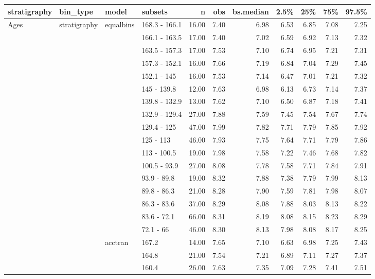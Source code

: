\begin{longtable}{llllrrrrrrr}
  \hline
stratigraphy & bin\_type & model & subsets & n & obs & bs.median & 2.5\% & 25\% & 75\% & 97.5\% \\ 
  \hline
Ages & stratigraphy & equalbins & 168.3 - 166.1 & 16.00 & 7.40 & 6.98 & 6.53 & 6.85 & 7.08 & 7.25 \\ 
   &  &  & 166.1 - 163.5 & 17.00 & 7.40 & 7.02 & 6.59 & 6.92 & 7.13 & 7.32 \\ 
   &  &  & 163.5 - 157.3 & 17.00 & 7.53 & 7.10 & 6.74 & 6.95 & 7.21 & 7.31 \\ 
   &  &  & 157.3 - 152.1 & 16.00 & 7.66 & 7.19 & 6.84 & 7.04 & 7.29 & 7.45 \\ 
   &  &  & 152.1 - 145 & 16.00 & 7.53 & 7.14 & 6.47 & 7.01 & 7.21 & 7.32 \\ 
   &  &  & 145 - 139.8 & 12.00 & 7.63 & 6.98 & 6.13 & 6.73 & 7.14 & 7.37 \\ 
   &  &  & 139.8 - 132.9 & 13.00 & 7.62 & 7.10 & 6.50 & 6.87 & 7.18 & 7.41 \\ 
   &  &  & 132.9 - 129.4 & 27.00 & 7.88 & 7.59 & 7.45 & 7.54 & 7.67 & 7.74 \\ 
   &  &  & 129.4 - 125 & 47.00 & 7.99 & 7.82 & 7.71 & 7.79 & 7.85 & 7.92 \\ 
   &  &  & 125 - 113 & 46.00 & 7.93 & 7.75 & 7.64 & 7.71 & 7.79 & 7.86 \\ 
   &  &  & 113 - 100.5 & 19.00 & 7.98 & 7.58 & 7.22 & 7.46 & 7.68 & 7.82 \\ 
   &  &  & 100.5 - 93.9 & 27.00 & 8.08 & 7.78 & 7.58 & 7.71 & 7.84 & 7.91 \\ 
   &  &  & 93.9 - 89.8 & 19.00 & 8.32 & 7.88 & 7.38 & 7.79 & 7.99 & 8.13 \\ 
   &  &  & 89.8 - 86.3 & 21.00 & 8.28 & 7.90 & 7.59 & 7.81 & 7.98 & 8.07 \\ 
   &  &  & 86.3 - 83.6 & 37.00 & 8.29 & 8.08 & 7.88 & 8.03 & 8.13 & 8.22 \\ 
   &  &  & 83.6 - 72.1 & 66.00 & 8.31 & 8.19 & 8.08 & 8.15 & 8.23 & 8.29 \\ 
   &  &  & 72.1 - 66 & 46.00 & 8.30 & 8.13 & 7.98 & 8.08 & 8.17 & 8.25 \\ 
   &  & acctran & 167.2 & 14.00 & 7.65 & 7.10 & 6.63 & 6.98 & 7.25 & 7.43 \\ 
   &  &  & 164.8 & 21.00 & 7.54 & 7.21 & 6.89 & 7.11 & 7.27 & 7.37 \\ 
   &  &  & 160.4 & 26.00 & 7.63 & 7.35 & 7.09 & 7.28 & 7.41 & 7.51 \\ 

\end{longtable}
